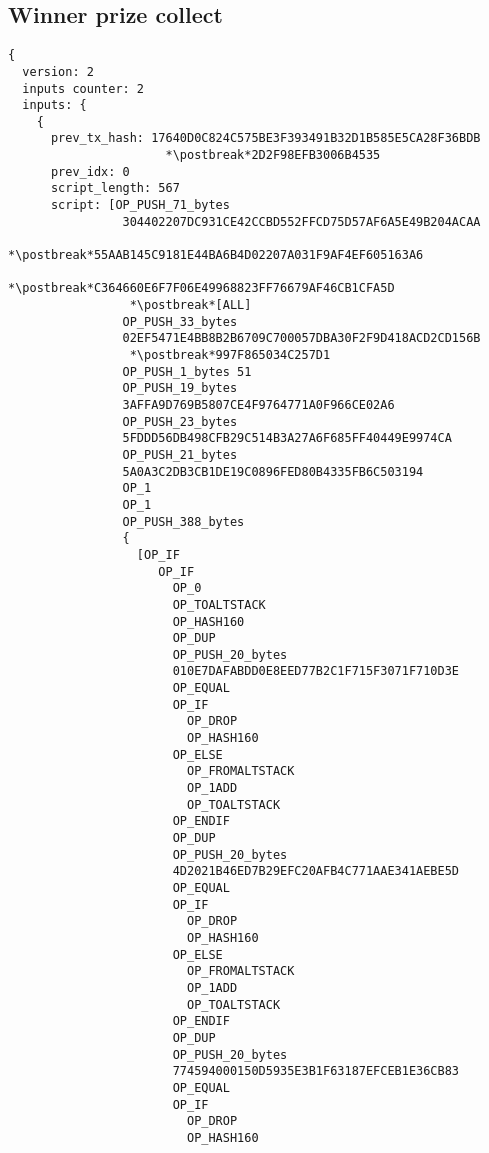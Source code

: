 \subsection{Winner prize collect}\label{app:winner_collect}
\begin{lstlisting}
{
  version: 2
  inputs counter: 2
  inputs: {
    {
      prev_tx_hash: 17640D0C824C575BE3F393491B32D1B585E5CA28F36BDB
                      *\postbreak*2D2F98EFB3006B4535
      prev_idx: 0
      script_length: 567
      script: [OP_PUSH_71_bytes
                304402207DC931CE42CCBD552FFCD75D57AF6A5E49B204ACAA
                 *\postbreak*55AAB145C9181E44BA6B4D02207A031F9AF4EF605163A6
                 *\postbreak*C364660E6F7F06E49968823FF76679AF46CB1CFA5D
                 *\postbreak*[ALL]
                OP_PUSH_33_bytes
                02EF5471E4BB8B2B6709C700057DBA30F2F9D418ACD2CD156B
                 *\postbreak*997F865034C257D1
                OP_PUSH_1_bytes 51
                OP_PUSH_19_bytes
                3AFFA9D769B5807CE4F9764771A0F966CE02A6
                OP_PUSH_23_bytes
                5FDDD56DB498CFB29C514B3A27A6F685FF40449E9974CA
                OP_PUSH_21_bytes
                5A0A3C2DB3CB1DE19C0896FED80B4335FB6C503194
                OP_1
                OP_1
                OP_PUSH_388_bytes
                {
                  [OP_IF
                     OP_IF
                       OP_0
                       OP_TOALTSTACK
                       OP_HASH160
                       OP_DUP
                       OP_PUSH_20_bytes
                       010E7DAFABDD0E8EED77B2C1F715F3071F710D3E
                       OP_EQUAL
                       OP_IF
                         OP_DROP
                         OP_HASH160
                       OP_ELSE
                         OP_FROMALTSTACK
                         OP_1ADD
                         OP_TOALTSTACK
                       OP_ENDIF
                       OP_DUP
                       OP_PUSH_20_bytes
                       4D2021B46ED7B29EFC20AFB4C771AAE341AEBE5D
                       OP_EQUAL
                       OP_IF
                         OP_DROP
                         OP_HASH160
                       OP_ELSE
                         OP_FROMALTSTACK
                         OP_1ADD
                         OP_TOALTSTACK
                       OP_ENDIF
                       OP_DUP
                       OP_PUSH_20_bytes
                       774594000150D5935E3B1F63187EFCEB1E36CB83
                       OP_EQUAL
                       OP_IF
                         OP_DROP
                         OP_HASH160

\end{lstlisting}

